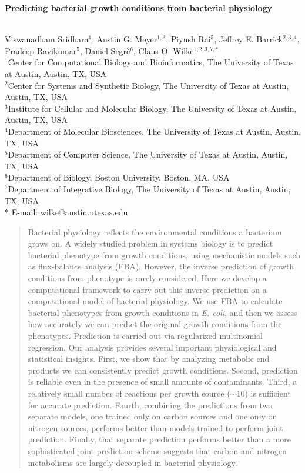 \documentclass[12pt]{article}
\date{}
\begin{document}
\begin{flushleft}
{\Large
\textbf{Predicting bacterial growth conditions from bacterial physiology}
}

\bigskip
\noindent
\\
Viswanadham Sridhara$^{1}$,
Austin G. Meyer$^{1,3}$,
Piyush Rai$^{5}$,
Jeffrey E. Barrick$^{2,3,4}$,
Pradeep Ravikumar$^{5}$,
Daniel Segr\`e$^{6}$, 
Claus O. Wilke$^{1,2,3,7,\ast}$
\\
\bigskip
$^1$Center for Computational Biology and Bioinformatics, The University of Texas at Austin, Austin, TX, USA
\\
$^2$Center for Systems and Synthetic Biology, The University of Texas at Austin, Austin, TX, USA
\\
$^3$Institute for Cellular and Molecular Biology, The University of Texas at Austin, Austin, TX, USA
\\
$^4$Department of Molecular Biosciences, The University of Texas at Austin, Austin, TX, USA
\\
$^5$Department of Computer Science, The University of Texas at Austin, Austin, TX, USA
\\
$^6$Department of Biology, Boston University, Boston, MA, USA
\\
$^7$Department of Integrative Biology, The University of Texas at Austin, Austin, TX, USA
\\
\bigskip
$\ast$ E-mail: wilke@austin.utexas.edu
\end{flushleft}

\begin{abstract}
Bacterial physiology reflects the environmental conditions a bacterium grows on. A widely studied problem in systems biology is to predict bacterial phenotype from growth conditions, using mechanistic models such as flux-balance analysis (FBA). However, the inverse prediction of growth conditions from phenotype is rarely considered. Here we develop a computational framework to carry out this inverse prediction on a computational model of bacterial physiology. We use FBA to calculate bacterial phenotypes from growth conditions in \emph{E. coli}, and then we assess how accurately we can predict the original growth conditions from the phenotypes. Prediction is carried out via regularized multinomial regression. Our analysis provides several important physiological and statistical insights. First, we show that by analyzing metabolic end products we can consistently predict growth conditions. Second, prediction is reliable even in the presence of small amounts of contaminants. Third, a relatively small number of reactions per growth source ($\sim10$) is sufficient for accurate prediction. Fourth, combining the predictions from two separate models, one trained only on carbon sources and one only on nitrogen sources, performs better than models trained to perform joint prediction. Finally, that separate prediction performs better than a more sophisticated joint prediction scheme suggests that carbon and nitrogen metabolisms are largely decoupled in bacterial physiology.
\end{abstract}
\end{document}
